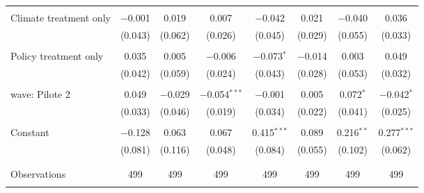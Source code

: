 \begin{tabular}{@{\extracolsep{5pt}}lccccccc}
  & & & & & & & \\ 
 Climate treatment only & $-$0.001 & 0.019 & 0.007 & $-$0.042 & 0.021 & $-$0.040 & 0.036 \\ 
  & (0.043) & (0.062) & (0.026) & (0.045) & (0.029) & (0.055) & (0.033) \\ 
  & & & & & & & \\ 
 Policy treatment only & 0.035 & 0.005 & $-$0.006 & $-$0.073$^{*}$ & $-$0.014 & 0.003 & 0.049 \\ 
  & (0.042) & (0.059) & (0.024) & (0.043) & (0.028) & (0.053) & (0.032) \\ 
  & & & & & & & \\ 
 wave: Pilote 2 & 0.049 & $-$0.029 & $-$0.054$^{***}$ & $-$0.001 & 0.005 & 0.072$^{*}$ & $-$0.042$^{*}$ \\ 
  & (0.033) & (0.046) & (0.019) & (0.034) & (0.022) & (0.041) & (0.025) \\ 
  & & & & & & & \\ 
 Constant & $-$0.128 & 0.063 & 0.067 & 0.415$^{***}$ & 0.089 & 0.216$^{**}$ & 0.277$^{***}$ \\ 
  & (0.081) & (0.116) & (0.048) & (0.084) & (0.055) & (0.102) & (0.062) \\ 
  & & & & & & & \\ 
\hline \\[-1.8ex] 

Observations & 499 & 499 & 499 & 499 & 499 & 499 & 499 \\ 
\hline 
\hline \\[-1.8ex] 
\end{tabular} 